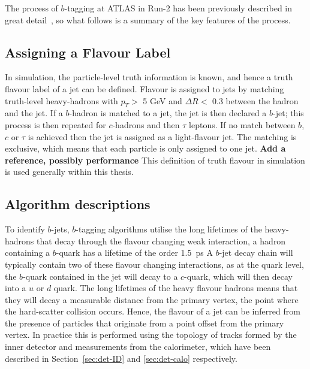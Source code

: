    The process of $b$-tagging at ATLAS in Run-2 has been previously described in great
   detail~\cite{obj-bjets_algo_2015,obj-bjets_algo_2016},
   so what follows is a summary of the key features of the process.
   
   \subsection{Assigning a Flavour Label}
   \label{sec:obj-bjets_label}

   In simulation, the particle-level truth information is known, and hence a truth flavour label of a jet can be defined.
   Flavour is assigned to jets by matching truth-level heavy-hadrons with $p_{T} >$ 5 GeV and $\Delta R <$ 0.3 between the hadron and the jet.
   If a $b$-hadron is matched to a jet, the jet is then declared a $b$-jet;
   this process is then repeated for $c$-hadrons and then $\tau$ leptons.
   If no match between $b$, $c$ or $\tau$ is achieved then the jet is assigned as a light-flavour jet.
   The matching is exclusive, which means that each particle is only assigned to one jet. \textbf{Add a reference, possibly performance}
   This definition of truth flavour in simulation is used generally within this thesis.
   
   \subsection{Algorithm descriptions}

   To identify $b$-jets, $b$-tagging algorithms utilise the long lifetimes of the heavy-hadrons that decay through the flavour changing weak interaction,
   a hadron containing a $b$-quark has a lifetime of the order \SI{1.5}{\pico\second} %
   A $b$-jet decay chain  will typically contain two of these flavour changing interactions, 
   as at the quark level, the $b$-quark contained in the jet will decay to a $c$-quark, which will then decay into a $u$ or $d$ quark.
   The long lifetimes of the heavy flavour hadrons means that they will decay a measurable distance from the 
   primary vertex, the point where the hard-scatter collision occurs.
   Hence, the flavour of a jet can be inferred from the presence of particles
   that originate from a point offset from the primary vertex.
   In practice this is performed using the topology of tracks formed by the inner detector
   and measurements from the calorimeter, which have been described in Section~\ref{sec:det-ID} and \ref{sec:det-calo} respectively.
   
